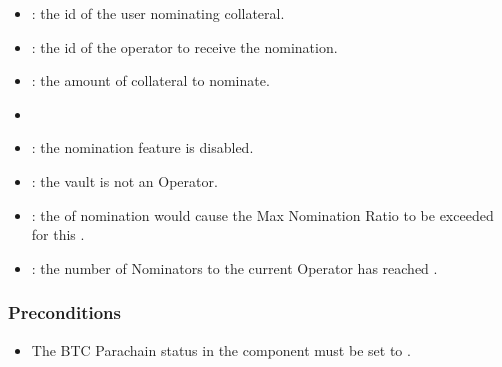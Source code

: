 \documentclass[a4paper,10pt,english]{sphinxmanual}
\begin{document}

\begin{itemize}
\item {} 
: the id of the user nominating collateral.

\item {} 
: the id of the operator to receive the nomination.

\item {} 
: the amount of collateral to nominate.

\end{itemize}

\begin{itemize}
\item {} 

\end{itemize}

\begin{itemize}
\item {} 
: the nomination feature is disabled.

\item {} 
: the vault is not an Operator.

\item {} 
: the  of nomination would cause the Max Nomination Ratio to be exceeded for this .

\item {} 
: the number of Nominators to the current Operator has reached .

\end{itemize}


\subsubsection{Preconditions}
\label{\detokenize{spec/nomination:id15}}\begin{itemize}
\item {} 
The BTC Parachain status in the {\hyperref[\detokenize{spec/security:security}]{}} component must be set to .

\end{itemize}
\end{document}
